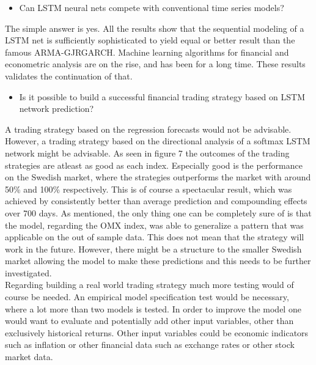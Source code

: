 \documentclass[12pt, letterpaper]{amsart}%
\begin{document}
\begin{itemize}
\item Can LSTM neural nets compete with conventional time series models?
\end{itemize}
\vspace{0.5cm}

The simple answer is yes. All the results show that the sequential modeling of a LSTM net is sufficiently sophisticated to yield equal or better result than the famous ARMA-GJRGARCH. Machine learning algorithms for financial and econometric analysis are on the rise, and has been for a long time. These results validates the continuation of that.
\\

\begin{itemize}
\item Is it possible to build a successful financial trading strategy based on LSTM network prediction?
\end{itemize}
\vspace{0.5cm}

A trading strategy based on the regression forecasts would not be advisable. However, a trading strategy based on the directional analysis of a softmax LSTM network might be advisable. As seen in figure 7 the outcomes of the trading strategies are atleast as good as each index. Especially good is the performance on the Swedish market, where the strategies outperforms the market with around 50\% and 100\% respectively. This is of course a spectacular result, which was achieved by consistently better than average prediction and compounding effects over 700 days. As mentioned, the only thing one can be completely sure of is that the model, regarding the OMX index, was able to generalize a pattern that was applicable on the out of sample data. This does not mean that the strategy will work in the future. However, there might be a structure to the smaller Swedish market allowing the model to make these predictions and this needs to be further investigated.
\\

Regarding building a real world trading strategy much more testing would of course be needed. An empirical model specification test would be necessary, where a lot more than two models is tested. In order to improve the model one would want to evaluate and potentially add other input variables, other than exclusively historical returns. Other input variables could be economic indicators such as inflation or other financial data such as exchange rates or other stock market data.
\end{document}
